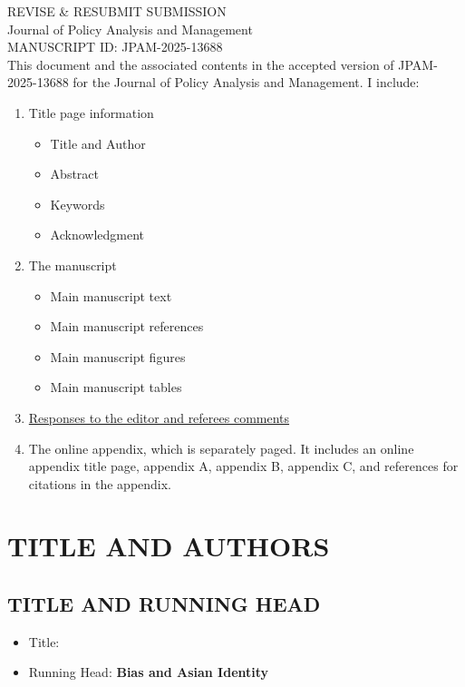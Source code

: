 \documentclass[12pt,english]{article}
\begin{document}
\thispagestyle{empty}
\begingroup
  \doublespacing
  \centering
  \LARGE REVISE \& RESUBMIT SUBMISSION\\[0.25em]
  \LARGE Journal of Policy Analysis and Management \\[0.25em]
  \LARGE MANUSCRIPT ID: JPAM-2025-13688 \\[1.0em]
\endgroup
This document and the associated contents in the accepted version of JPAM-2025-13688 for the Journal of Policy Analysis and Management. I include:
\begin{enumerate}
    \item Title page information
    \begin{itemize}
        \item Title and Author
        \item Abstract
        \item Keywords
        \item Acknowledgment
    \end{itemize}
    \item The manuscript
    \begin{itemize}
        \item Main manuscript text
        \item Main manuscript references
        \item Main manuscript figures
        \item Main manuscript tables
    \end{itemize}  
    \item \hyperref[r&r:responses]{Responses to the editor and referees comments}
    \item The online appendix, which is separately paged. It includes an online appendix title page, appendix A, appendix B, appendix C, and references for citations in the appendix.
\end{enumerate}
\clearpage



\setcounter{page}{1}

\section*{TITLE AND AUTHORS}
\subsection*{TITLE AND RUNNING HEAD}
\begin{itemize}[label={}, leftmargin=*]
    \item Title: \textbf{\PAPERTITLE}
    \item Running Head:  \textbf{Bias and Asian Identity}
\end{itemize}
\end{document}
